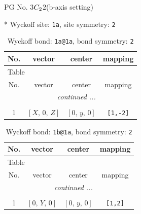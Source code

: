 \documentclass[fleqn,8pt]{jsarticle}
\begin{document}
\setcounter{MaxMatrixCols}{32}

\renewcommand{\tablename}{Table~}
\renewcommand{\figurename}{Figure~}
\begin{center}
\LARGE
PG No. 3\quad$C_{\rm 2}$\quad$2$\quad(b-axis setting)\quad[ monoclinic ]
\end{center}


* Wyckoff site: {\tt 1a}, site symmetry: {\tt 2}
\renewcommand{\arraystretch}{1.2}
\begin{longtable}{cccc}
\caption{Wyckoff bond: {\tt 1a@1a}, bond symmetry: {\tt 2}}
 \\
 \hline \hline
No. & vector & center & mapping \\ \hline \endfirsthead

\multicolumn{3}{l}{\tablename\ \thetable{}} \\
 \hline \hline
No. & vector & center & mapping \\ \hline \endhead

 \hline \hline
\multicolumn{3}{r}{\footnotesize\it continued ...} \\ \endfoot

 \hline \hline
\multicolumn{3}{r}{} \\ \endlastfoot

1 & $\left[ X,\, 0,\, Z \right]$ & $\left[ 0,\, y,\, 0 \right]$ & {\tt [1,-2]} \\
\end{longtable}
\renewcommand{\arraystretch}{1.2}
\begin{longtable}{cccc}
\caption{Wyckoff bond: {\tt 1b@1a}, bond symmetry: {\tt 2}}
 \\
 \hline \hline
No. & vector & center & mapping \\ \hline \endfirsthead

\multicolumn{3}{l}{\tablename\ \thetable{}} \\
 \hline \hline
No. & vector & center & mapping \\ \hline \endhead

 \hline \hline
\multicolumn{3}{r}{\footnotesize\it continued ...} \\ \endfoot

 \hline \hline
\multicolumn{3}{r}{} \\ \endlastfoot

1 & $\left[ 0,\, Y,\, 0 \right]$ & $\left[ 0,\, y,\, 0 \right]$ & {\tt [1,2]} \\
\end{longtable}
\renewcommand{\arraystretch}{1.2}
\end{document}
